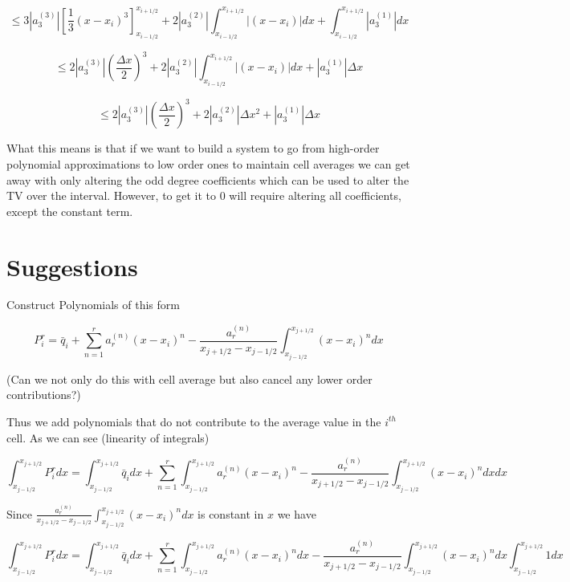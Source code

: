 \documentclass[10pt]{article}
\begin{document}
\[ \le 3 \left|a^{(3)}_3 \right| \left[\frac{1}{3}(x  - x_i)^3\right]_{x_{i-1/2}}^{x_{i+1/2}}  +  2\left| a^{(2)}_3\right| \int_{x_{i-1/2}}^{x_{i+1/2}}  \left|(x  - x_i)\right|dx  +  \int_{x_{i-1/2}}^{x_{i+1/2}} \left|a^{(1)}_3\right| dx\]


\[ \le 2 \left|a^{(3)}_3\right|\left(\frac{\Delta x}{2}\right)^3   +  2\left| a^{(2)}_3\right| \int_{x_{i-1/2}}^{x_{i+1/2}}  \left|(x  - x_i)\right|dx  +   \left|a^{(1)}_3\right| \Delta x \]

\[ \le 2 \left|a^{(3)}_3\right|\left(\frac{\Delta x}{2}\right)^3   +  2\left| a^{(2)}_3\right| \Delta x ^2 +   \left|a^{(1)}_3\right| \Delta x \]

What this means is that if we want to build a system to go from high-order polynomial approximations to low order ones to maintain cell averages we can get away with only altering the odd degree coefficients which can be used to alter the TV over the interval. However, to get it to $0$ will require altering all coefficients, except the constant term. 


\section{Suggestions}
Construct Polynomials of this form

\[P^r_i = \bar{q}_i + \sum_{n=1}^{r} a^{(n)}_r\left(x - x_i\right)^n - \frac{a^{(n)}_r}{x_{j+1/2} - x_{j-1/2}}\int_{x_{j-1/2}}^{x_{j+1/2}}(x  - x_i)^n dx \]

(Can we not only do this with cell average but also cancel any lower order contributions?)

Thus we add polynomials that do not contribute to the average value in the $i^{th}$ cell. As we can see (linearity of integrals)


\[ \int_{x_{j-1/2}}^{x_{j+1/2}} P^r_i dx =  \int_{x_{j-1/2}}^{x_{j+1/2}} \bar{q}_i dx + \sum_{n=1}^{r}  \int_{x_{j-1/2}}^{x_{j+1/2}} a^{(n)}_r\left(x - x_i\right)^n - \frac{a^{(n)}_r}{x_{j+1/2} - x_{j-1/2}}\int_{x_{j-1/2}}^{x_{j+1/2}}(x  - x_i)^n dx dx \]

Since $\frac{a^{(n)}_r}{x_{j+1/2} - x_{j-1/2}}\int_{x_{j-1/2}}^{x_{j+1/2}}(x  - x_i)^n dx$ is constant in $x$ we have


\[ \int_{x_{j-1/2}}^{x_{j+1/2}} P^r_i dx =  \int_{x_{j-1/2}}^{x_{j+1/2}} \bar{q}_i dx + \sum_{n=1}^{r}  \int_{x_{j-1/2}}^{x_{j+1/2}} a^{(n)}_r\left(x - x_i\right)^n dx  - \frac{a^{(n)}_r}{x_{j+1/2} - x_{j-1/2}}\int_{x_{j-1/2}}^{x_{j+1/2}}(x  - x_i)^n dx \int_{x_{j-1/2}}^{x_{j+1/2}} 1 dx  \] 
\end{document}
